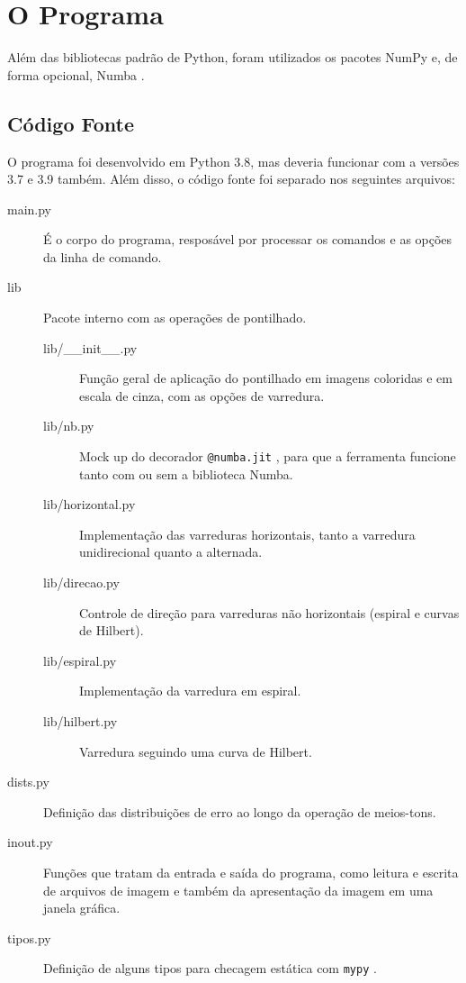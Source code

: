 \section{O Programa}

Além das bibliotecas padrão de Python, foram utilizados os pacotes NumPy \autocite{ref:numpy} e, de forma opcional, Numba \autocite{ref:numba}.

\subsection{Código Fonte}

    O programa foi desenvolvido em Python 3.8, mas deveria funcionar com a versões 3.7 e 3.9 também. Além disso, o código fonte foi separado nos seguintes arquivos:

    \begin{description}
        \item[main.py] É o corpo do programa, resposável por processar os comandos e as opções da linha de comando.

        \item[lib] Pacote interno com as operações de pontilhado.

        \begin{description}
            \item[lib/\_\_init\_\_.py] Função geral de aplicação do pontilhado em imagens coloridas e em escala de cinza, com as opções de varredura.

            \item[lib/nb.py] Mock up do decorador \texttt{@numba.jit} \autocite{ref:numbajit}, para que a ferramenta funcione tanto com ou sem a biblioteca Numba.

            \item[lib/horizontal.py] Implementação das varreduras horizontais, tanto a varredura unidirecional quanto a alternada.

            \item[lib/direcao.py] Controle de direção para varreduras não horizontais (espiral e curvas de Hilbert).

            \item[lib/espiral.py] Implementação da varredura em espiral.

            \item[lib/hilbert.py] Varredura seguindo uma curva de Hilbert.
        \end{description}

        \item[dists.py] Definição das distribuições de erro ao longo da operação de meios-tons.

        \item[inout.py] Funções que tratam da entrada e saída do programa, como leitura e escrita de arquivos de imagem e também da apresentação da imagem em uma janela gráfica.

        \item[tipos.py] Definição de alguns tipos para checagem estática com \texttt{mypy} \autocite{ref:mypy}.
    \end{description}

